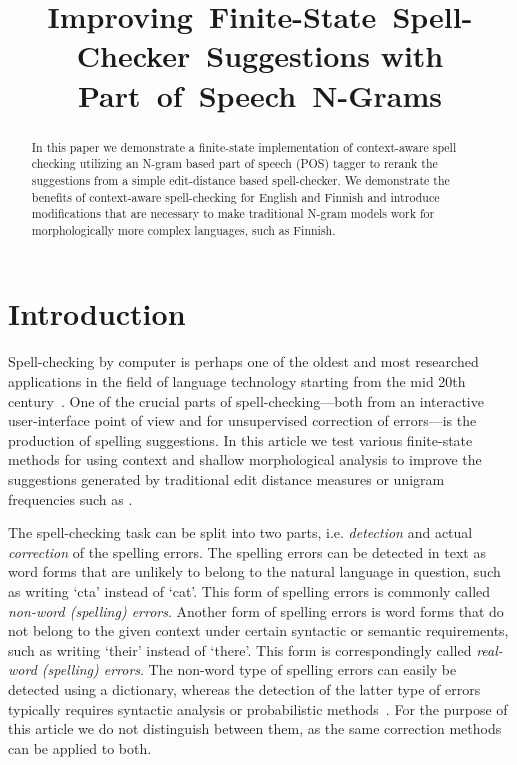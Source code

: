 \documentclass{llncs}
\begin{document}
\title{Improving~Finite-State~Spell-Checker~Suggestions with 
Part~of~Speech~N-Grams}




\maketitle

\begin{abstract}
  In this paper we demonstrate a finite-state implementation of context-aware
  spell checking utilizing an N-gram based part of speech (POS) tagger to rerank the
  suggestions from a simple edit-distance based spell-checker. We
  demonstrate the benefits of context-aware spell-checking for English and Finnish and
  introduce modifications that are necessary to make traditional N-gram
  models work for morphologically more complex languages, such as Finnish.
\end{abstract}

\section{Introduction}

Spell-checking by computer is perhaps one of the oldest and most researched
applications in the field of language technology starting from the mid 20th
century~\cite{damerau/1964}. One of the crucial parts of spell-checking---both
from an interactive user-interface point of view and for unsupervised correction
of errors---is the production of spelling suggestions.  In this article we test
various finite-state methods for using context and shallow morphological
analysis to improve the suggestions generated by traditional edit distance
measures or unigram frequencies such as \cite{pirinen/2010/lrec}.

The spell-checking task can be split into two parts, i.e. \emph{detection} and
actual \emph{correction} of the spelling errors. The spelling errors can be
detected in text as word forms that are unlikely to belong to the
natural language in question, such as writing `cta' instead of `cat'. This form
of spelling errors is commonly called \emph{non-word (spelling) errors}.
Another form of spelling errors is word forms that do not belong to the given
context under certain syntactic or semantic requirements, such as writing
`their' instead of `there'. This form is correspondingly called \emph{real-word
(spelling) errors}. The non-word type of spelling errors can easily be detected
using a dictionary, whereas the detection of the latter type of errors typically
requires syntactic analysis or probabilistic methods~\cite{mitton/2009}. For
the purpose of this article we do not distinguish between them, as the same
correction methods can be applied to both.
\end{document}
